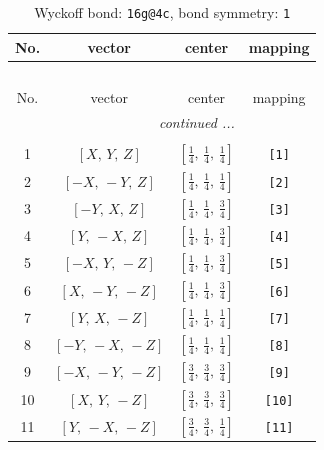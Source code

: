 \documentclass[fleqn,8pt]{jsarticle}
\begin{document}
\begin{longtable}{cccc}
\caption{Wyckoff bond: {\tt 16g@4c}, bond symmetry: {\tt 1}}
 \\
 \hline \hline
No. & vector & center & mapping \\ \hline \endfirsthead

\multicolumn{3}{l}{\tablename\ \thetable{}} \\
 \hline \hline
No. & vector & center & mapping \\ \hline \endhead

 \hline \hline
\multicolumn{3}{r}{\footnotesize\it continued ...} \\ \endfoot

 \hline \hline
\multicolumn{3}{r}{} \\ \endlastfoot

1 & $\left[ X,\, Y,\, Z \right]$ & $\left[ \frac{1}{4},\, \frac{1}{4},\, \frac{1}{4} \right]$ & {\tt [1]} \\ \hline
2 & $\left[ - X,\, - Y,\, Z \right]$ & $\left[ \frac{1}{4},\, \frac{1}{4},\, \frac{1}{4} \right]$ & {\tt [2]} \\ \hline
3 & $\left[ - Y,\, X,\, Z \right]$ & $\left[ \frac{1}{4},\, \frac{1}{4},\, \frac{3}{4} \right]$ & {\tt [3]} \\ \hline
4 & $\left[ Y,\, - X,\, Z \right]$ & $\left[ \frac{1}{4},\, \frac{1}{4},\, \frac{3}{4} \right]$ & {\tt [4]} \\ \hline
5 & $\left[ - X,\, Y,\, - Z \right]$ & $\left[ \frac{1}{4},\, \frac{1}{4},\, \frac{3}{4} \right]$ & {\tt [5]} \\ \hline
6 & $\left[ X,\, - Y,\, - Z \right]$ & $\left[ \frac{1}{4},\, \frac{1}{4},\, \frac{3}{4} \right]$ & {\tt [6]} \\ \hline
7 & $\left[ Y,\, X,\, - Z \right]$ & $\left[ \frac{1}{4},\, \frac{1}{4},\, \frac{1}{4} \right]$ & {\tt [7]} \\ \hline
8 & $\left[ - Y,\, - X,\, - Z \right]$ & $\left[ \frac{1}{4},\, \frac{1}{4},\, \frac{1}{4} \right]$ & {\tt [8]} \\ \hline
9 & $\left[ - X,\, - Y,\, - Z \right]$ & $\left[ \frac{3}{4},\, \frac{3}{4},\, \frac{3}{4} \right]$ & {\tt [9]} \\ \hline
10 & $\left[ X,\, Y,\, - Z \right]$ & $\left[ \frac{3}{4},\, \frac{3}{4},\, \frac{3}{4} \right]$ & {\tt [10]} \\ \hline
11 & $\left[ Y,\, - X,\, - Z \right]$ & $\left[ \frac{3}{4},\, \frac{3}{4},\, \frac{1}{4} \right]$ & {\tt [11]} \\ \hline

\end{longtable}
\end{document}
